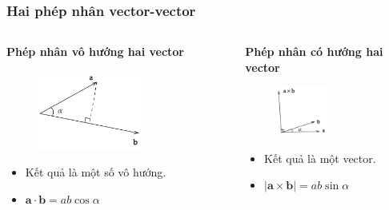 \begin{frame}
\frametitle{Hai phép nhân vector-vector}
\begin{columns}
\begin{column}{0.5\textwidth}
    \textbf{Phép nhân vô hướng hai vector}
    \begin{figure}
    \centering
    \includegraphics[width=0.65\textwidth]{Slides/Figure/tichcham.png}
    \end{figure}
    \begin{itemize}
        \item Kết quả là một số vô hướng.
        \item \(\mathbf a \cdot \mathbf b = ab \cos \alpha\)
    \end{itemize}
\end{column}
\begin{column}{0.5\textwidth}
    \textbf{Phép nhân có hướng hai vector}
    \begin{figure}
    \centering
    \includegraphics[width=0.5\textwidth]{Slides/Figure/tichcheo.png}
    \end{figure}
    \begin{itemize}
        \item Kết quả là một vector.
        \item \(|\mathbf a \times \mathbf b| = ab \sin \alpha\)
    \end{itemize}
\end{column}
\end{columns}
\end{frame}